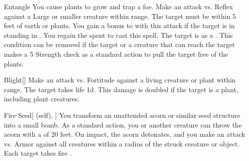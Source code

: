 \lowercase{\hypertarget{spell:Entangle}{}}\label{spell:Entangle}
\begin{apability}[\nth{1}]{\hypertarget{spell:Entangle}{Entangle}}
You cause plants to grow and trap a foe.
Make an attack vs. Reflex against a Large or smaller creature within \rngmed range.
The target must be within 5 feet of earth or plants.
You gain a  bonus to  with this attack if the target is in standing in .
\miss You regain the  spent to cast this spell.
\hit The target is  as a .
This condition can be removed if the target or a creature that can reach the target makes a  5 Strength check as a standard action to pull the target free of the plants.
\end{apability}
\vspace{0.25em}



\lowercase{\hypertarget{spell:Blight}{}}\label{spell:Blight}
\begin{apability}[\nth{2}]{\hypertarget{spell:Blight}{Blight}}[]
Make an attack vs. Fortitude against a living creature or plant within \rngmed range.
\hit The target takes life  \plus1d.
This damage is doubled if the target is a plant, including plant creatures.
\end{apability}
\vspace{0.25em}



\lowercase{\hypertarget{spell:Fire Seed}{}}\label{spell:Fire Seed}
\begin{attuneability}[\nth{2}]{\hypertarget{spell:Fire Seed}{Fire Seed}}[ (self), ]
You transform an unattended acorn or similar seed structure into a small bomb.
As a standard action, you or another creature can throw the acorn with a  of 20 feet.
On impact, the acorn detonates, and you make an attack vs. Armor against all creatures within a \areasmall radius of the struck creature or object.
\hit Each target takes fire .
\end{attuneability}
\vspace{0.25em}



